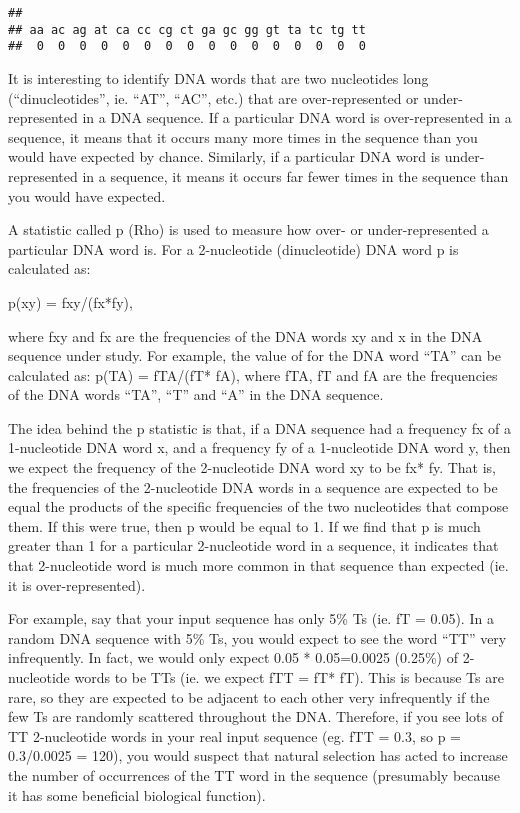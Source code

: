 \documentclass[
]{book}
\begin{document}
\begin{verbatim}
## 
## aa ac ag at ca cc cg ct ga gc gg gt ta tc tg tt 
##  0  0  0  0  0  0  0  0  0  0  0  0  0  0  0  0
\end{verbatim}

It is interesting to identify DNA words that are two nucleotides long (``dinucleotides'', ie. ``AT'', ``AC'', etc.) that are over-represented or under-represented in a DNA sequence. If a particular DNA word is over-represented in a sequence, it means that it occurs many more times in the sequence than you would have expected by chance. Similarly, if a particular DNA word is under-represented in a sequence, it means it occurs far fewer times in the sequence than you would have expected.

A statistic called p (Rho) is used to measure how over- or under-represented a particular DNA word is. For a 2-nucleotide (dinucleotide) DNA word p is calculated as:

p(xy) = fxy/(fx*fy),

where fxy and fx are the frequencies of the DNA words xy and x in the DNA sequence under study. For example, the value of for the DNA word ``TA'' can be calculated as: p(TA) = fTA/(fT* fA), where fTA, fT and fA are the frequencies of the DNA words ``TA'', ``T'' and ``A'' in the DNA sequence.

The idea behind the p statistic is that, if a DNA sequence had a frequency fx of a 1-nucleotide DNA word x, and a frequency fy of a 1-nucleotide DNA word y, then we expect the frequency of the 2-nucleotide DNA word xy to be fx* fy. That is, the frequencies of the 2-nucleotide DNA words in a sequence are expected to be equal the products of the specific frequencies of the two nucleotides that compose them. If this were true, then p would be equal to 1. If we find that p is much greater than 1 for a particular 2-nucleotide word in a sequence, it indicates that that 2-nucleotide word is much more common in that sequence than expected (ie. it is over-represented).

For example, say that your input sequence has only 5\% Ts (ie. fT = 0.05). In a random DNA sequence with 5\% Ts, you would expect to see the word ``TT'' very infrequently. In fact, we would only expect 0.05 * 0.05=0.0025 (0.25\%) of 2-nucleotide words to be TTs (ie. we expect fTT = fT* fT). This is because Ts are rare, so they are expected to be adjacent to each other very infrequently if the few Ts are randomly scattered throughout the DNA. Therefore, if you see lots of TT 2-nucleotide words in your real input sequence (eg. fTT = 0.3, so p = 0.3/0.0025 = 120), you would suspect that natural selection has acted to increase the number of occurrences of the TT word in the sequence (presumably because it has some beneficial biological function).
\end{document}
